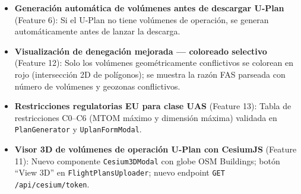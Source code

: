 \documentclass[12pt,a4paper]{article}
\begin{document}
\begin{itemize}
    \item \textbf{Generación automática de volúmenes antes de descargar U-Plan} (Feature 6): Si el U-Plan no tiene volúmenes de operación, se generan automáticamente antes de lanzar la descarga.
    \item \textbf{Visualización de denegación mejorada --- coloreado selectivo} (Feature 12): Solo los volúmenes geométricamente conflictivos se colorean en rojo (intersección 2D de polígonos); se muestra la razón FAS parseada con número de volúmenes y geozonas conflictivos.
    \item \textbf{Restricciones regulatorias EU para clase UAS} (Feature 13): Tabla de restricciones C0--C6 (MTOM máximo y dimensión máxima) validada en \texttt{PlanGenerator} y \texttt{UplanFormModal}.
    \item \textbf{Visor 3D de volúmenes de operación U-Plan con CesiumJS} (Feature 11): Nuevo componente \texttt{Cesium3DModal} con globe OSM Buildings; botón ``View 3D'' en \texttt{FlightPlansUploader}; nuevo endpoint \texttt{GET /api/cesium/token}.
\end{itemize}
\end{document}
